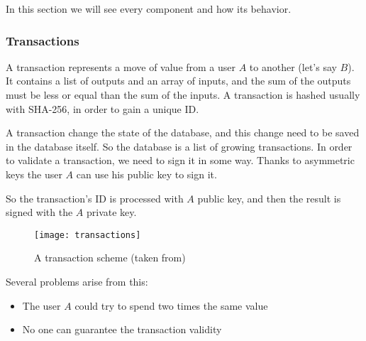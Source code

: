 In this section we will see every component and how its behavior.

\subsubsection{Transactions}
A transaction represents a move of value from a user $A$ to another (let's say
$B$). It contains a list of outputs and an array of inputs\cite{sok15}, and
the sum of the outputs must be less or equal than the sum of the inputs. A
transaction is hashed usually with SHA-256, in order to gain a unique ID.

A transaction change the state of the database, and this change need to be saved
in the database itself. So the database is a list of growing transactions.
In order to validate a transaction, we need to sign it in some way. Thanks to
asymmetric keys the user $A$ can use his public key to sign it.

So the transaction's ID is processed with $A$ public key, and then the result
is signed with the $A$ private key.

\begin{figure}[H]
 \centering
 \texttt{[image: transactions]}
 \caption{A transaction scheme (taken from\cite{nakamoto08})}
\end{figure}

Several problems arise from this:
\begin{itemize}
 \item The user $A$ could try to spend two times the same value
 \item No one can guarantee the transaction validity
\end{itemize}
